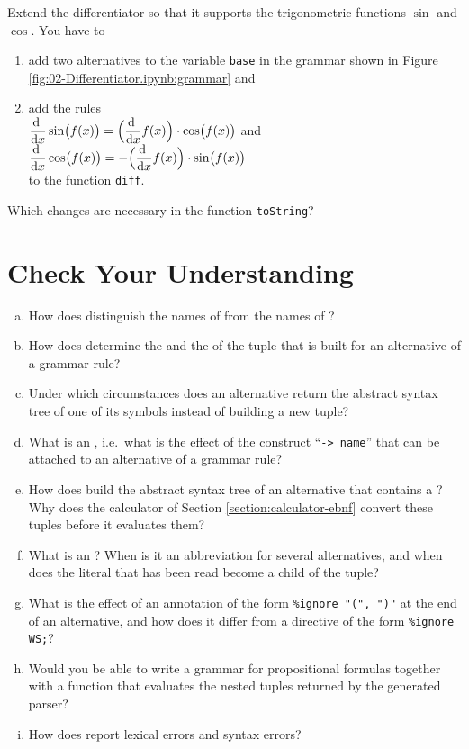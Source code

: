 \exerciseEng
Extend the differentiator so that it supports the trigonometric functions $\sin$ and $\cos$.  You have to
\begin{enumerate}
\item add two alternatives to the variable \texttt{base} in the grammar shown in Figure
      \ref{fig:02-Differentiator.ipynb:grammar} and
\item add the rules
      \\[0.2cm]
      \hspace*{1.3cm}
      $\displaystyle\frac{\mathrm{d}\;}{\mathrm{d}x}\sin\bigl(f(x)\bigr)
       = \Bigl(\frac{\mathrm{d}\;}{\mathrm{d}x} f(x)\Bigr) \cdot \cos\bigl(f(x)\bigr)$
      \quad and \quad
      $\displaystyle\frac{\mathrm{d}\;}{\mathrm{d}x}\cos\bigl(f(x)\bigr)
       = -\Bigl(\frac{\mathrm{d}\;}{\mathrm{d}x} f(x)\Bigr) \cdot \sin\bigl(f(x)\bigr)$
      \\[0.2cm]
      to the function \texttt{diff}.
\end{enumerate}
Which changes are necessary in the function \texttt{toString}? \eox

\section{Check Your Understanding}
\begin{enumerate}[(a)]
\item How does  distinguish the names of  from the names of
      ?
\item How does  determine the  and the  of the tuple that is built
      for an alternative of a grammar rule?
\item Under which circumstances does an alternative return the abstract syntax tree of one of its symbols
      instead of building a new tuple?
\item What is an , i.e.~what is the effect of the construct ``\texttt{-> name}'' that can be
      attached to an alternative of a grammar rule?
\item How does  build the abstract syntax tree of an alternative that contains a
      ?  Why does the calculator of Section \ref{section:calculator-ebnf} convert these tuples
      before it evaluates them?
\item What is an ?  When is it an abbreviation for several alternatives, and when does
      the literal that has been read become a child of the tuple?
\item What is the effect of an annotation of the form \texttt{\%ignore "(", ")"} at the end of an alternative,
      and how does it differ from a directive of the form \texttt{\%ignore WS;}?
\item Would you be able to write a  grammar for propositional formulas together with a
      function that evaluates the nested tuples returned by the generated parser?
\item How does  report lexical errors and syntax errors?
\end{enumerate}


